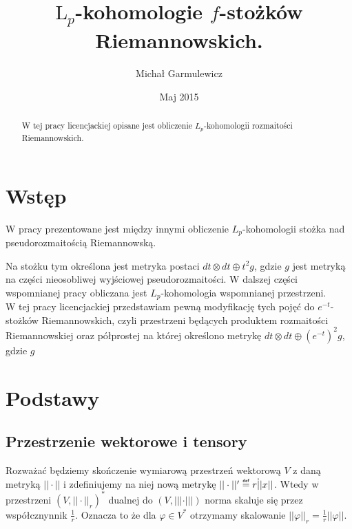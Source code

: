 \documentclass[licencjacka]{pracamgr}
\author{Michał Garmulewicz}
\title{$\mathrm{L}_p$-kohomologie $f$-stożków Riemannowskich.}
\date{Maj 2015}
\theoremstyle{definition}
\theoremstyle{definition}
\theoremstyle{plain}
\theoremstyle{plain}
\newcommand\deff{\mathrel{\overset{\makebox[0pt]{\mbox{\normalfont\tiny\sffamily def}}}{=}}}
\begin{document}
\maketitle

\begin{abstract}
  W tej pracy licencjackiej opisane jest obliczenie $L_p$-kohomologii
  rozmaitości Riemannowskich.
\end{abstract}

\tableofcontents

\chapter{Wstęp}

W pracy \cite{weber} prezentowane jest między innymi obliczenie
$L_p$-kohomologii stożka nad pseudorozmaitością Riemannowską. 

Na stożku tym określona jest metryka postaci
$dt \otimes dt \oplus t^2 g$, gdzie $g$ 
jest metryką na części nieosobliwej wyjściowej pseudorozmaitości.
W dalszej części wspomnianej pracy obliczana jest $L_p$-kohomologia
wspomnianej przestrzeni.
\\


W tej pracy licencjackiej przedstawiam pewną modyfikację tych pojęć
do $e^{-t}$-stożków Riemannowskich, czyli przestrzeni będących produktem rozmaitości
Riemannowskiej oraz półprostej na której określono metrykę
$dt \otimes dt \oplus (e^{-t})^2 g$, gdzie $g$ 


\chapter{Podstawy}
\section{Przestrzenie wektorowe i tensory}
Rozważać będziemy skończenie wymiarową przestrzeń wektorową $V$ 
z daną metryką $|| \cdot ||$ i zdefiniujemy na niej nową metrykę
$|| \cdot ||' \deff r \dot || x ||$. Wtedy w przestrzeni 
$(V, || \cdot||_r)^\ast$ dualnej do $(V, ||| \cdot |||)$ norma skaluje
się przez współcznynnik
$\frac{1}{r}$. Oznacza to że dla
$\varphi \in V^\ast$ otrzymamy skalowanie
$||\varphi||_r = \frac{1}{r} ||\varphi|| $. \\
\end{document}
